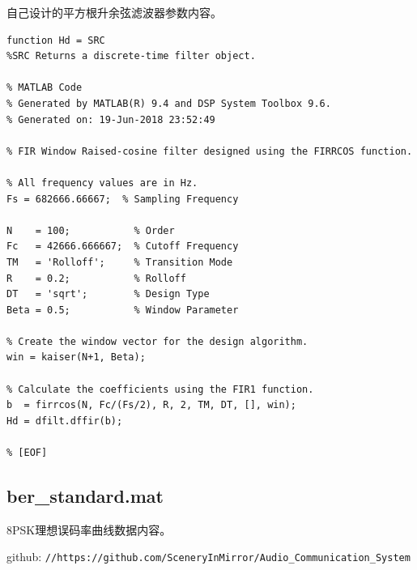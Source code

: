 \begin{spacing}{1.5}
自己设计的平方根升余弦滤波器参数内容。

\begin{lstlisting}
function Hd = SRC
%SRC Returns a discrete-time filter object.

% MATLAB Code
% Generated by MATLAB(R) 9.4 and DSP System Toolbox 9.6.
% Generated on: 19-Jun-2018 23:52:49

% FIR Window Raised-cosine filter designed using the FIRRCOS function.

% All frequency values are in Hz.
Fs = 682666.66667;  % Sampling Frequency

N    = 100;           % Order
Fc   = 42666.666667;  % Cutoff Frequency
TM   = 'Rolloff';     % Transition Mode
R    = 0.2;           % Rolloff
DT   = 'sqrt';        % Design Type
Beta = 0.5;           % Window Parameter

% Create the window vector for the design algorithm.
win = kaiser(N+1, Beta);

% Calculate the coefficients using the FIR1 function.
b  = firrcos(N, Fc/(Fs/2), R, 2, TM, DT, [], win);
Hd = dfilt.dffir(b);

% [EOF]
\end{lstlisting}

\subsection{ber\_standard.mat}

8PSK理想误码率曲线数据内容。


github: \verb|//https://github.com/SceneryInMirror/Audio_Communication_System|

\end{spacing}

